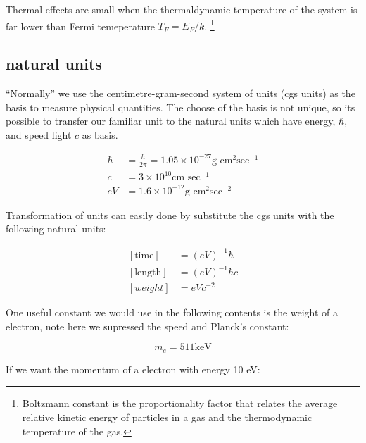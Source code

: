 \documentclass[a4paper, 11pt]{article}
\numberwithin{equation}{subsection}
\begin{document}
Thermal effects are small when the thermaldynamic temperature of the system is far lower than Fermi temeperature $T_F = E_F/k$. \footnote{Boltzmann constant is the proportionality factor that relates the average relative kinetic energy of particles in a gas and the thermodynamic temperature of the gas.} 


  \subsection{natural units}

    ``Normally'' we use the centimetre-gram-second system of units (cgs units) as the basis to measure physical quantities. The choose of the basis is not unique, so its possible to transfer our familiar unit to the natural units which have energy, $\hbar$, and speed light $c$ as basis.

    \begin{equation}
      \begin{aligned}
      \label{eq:natural-quantities}
      \hbar &= \frac{h}{2\pi} = 1.05 \times 10^{-27} \textrm{g cm}^2 \textrm{sec} ^{-1}\\
      c &= 3 \times 10 ^{10} \textrm{cm sec}^{-1}\\
      eV &= 1.6 \times 10 ^{-12} \textrm{g cm}^2 \textrm{sec}^{-2}
    \end{aligned}
  \end{equation}

    Transformation of units can easily done by substitute the cgs units with the following natural units:

    \begin{equation}
      \begin{aligned}
	[\textrm{time}] &= (eV) ^{-1} \hbar\\
	[\textrm{length}] &= (eV) ^{-1} \hbar c\\
	\left[ weight \right] &= eV c^{-2}
      \end{aligned}
    \end{equation}

    One useful constant we would use in the following contents is the weight of a electron, note here we supressed the speed and Planck's constant:

    \begin{equation}
      m_e = 511  \textrm{keV}
    \end{equation}

    If we want the momentum of a electron with energy 10 eV:
\end{document}
